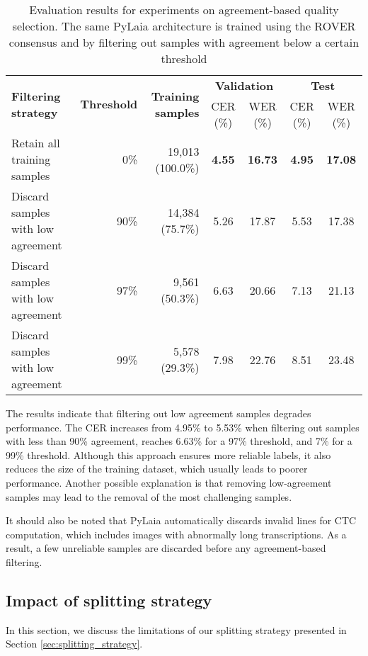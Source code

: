 \documentclass[sigconf]{acmart}
\begin{document}
\begin{table*}[thb]
    \centering
    \caption{Evaluation results for experiments on agreement-based quality selection. The same PyLaia architecture is trained using the ROVER consensus and by filtering out samples with agreement below a certain threshold}
    \label{tab:results_sample_selection}
    \begin{tabular}{l|rrcccc}
    \toprule
        \multirow{2}{*}{\bf Filtering strategy} & \multirow{2}{*}{\bf Threshold} & \multirow{2}{*}{\bf Training samples} & \multicolumn{2}{c}{\bf Validation} & \multicolumn{2}{c}{\bf Test} \\
        & & & CER (\%) & WER (\%) & CER (\%) & WER (\%) \\
    \midrule
        Retain all training samples & 0\% & 19,013 (100.0\%) & \textbf{4.55} & \textbf{16.73} & \textbf{4.95} & \textbf{17.08} \\
        Discard samples with low agreement & 90\% & 14,384 (75.7\%) & 5.26 & 17.87 & 5.53 & 17.38 \\
        Discard samples with low agreement & 97\%  & 9,561 (50.3\%) & 6.63 & 20.66 & 7.13 & 21.13 \\
        Discard samples with low agreement & 99\%  & 5,578 (29.3\%) & 7.98 & 22.76 & 8.51 & 23.48 \\
    \bottomrule
    \end{tabular}
\end{table*}
The results indicate that filtering out low agreement samples degrades performance. The CER increases from 4.95\% to 5.53\% when filtering out samples with less than 90\% agreement, reaches 6.63\% for a 97\% threshold, and 7\% for a 99\% threshold.
Although this approach ensures more reliable labels, it also reduces the size of the training dataset, which usually leads to poorer performance. Another possible explanation is that removing low-agreement samples may lead to the removal of the most challenging samples. 

It should also be noted that PyLaia automatically discards invalid lines for CTC computation, which includes images with abnormally long transcriptions. As a result, a few unreliable samples are discarded before any agreement-based filtering.

\subsection{Impact of splitting strategy}
\label{sec:bias}
In this section, we discuss the limitations of our splitting strategy presented in Section 
\ref{sec:splitting_strategy}.
\end{document}
